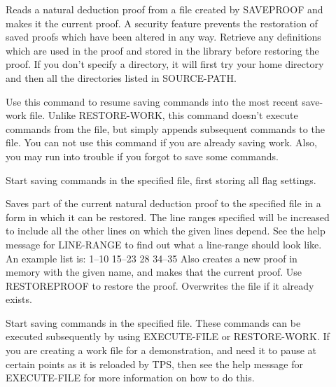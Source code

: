 \begin{description}
\item[\parbox{\textwidth}{RESTOREPROOF \textit{savefile}}]  
Reads a natural deduction proof from a file created by SAVEPROOF
and makes it the current proof.  A security feature prevents the 
restoration of saved proofs which have been altered in any way.
Retrieve any definitions which are used in the proof and stored in the
library before restoring the proof. If you don't specify a directory,
it will first try your home directory and then all the directories 
listed in SOURCE-PATH.

\item[\parbox{\textwidth}{RESUME-SAVE}]  
Use this command to resume saving commands into the most recent
save-work file.  Unlike RESTORE-WORK, this command doesn't
execute commands from the file, but simply appends subsequent commands to
the file.  You can not use this command if you are already saving work.
Also, you may run into trouble if you forgot to save some commands. 

\item[\parbox{\textwidth}{SAVE-FLAGS-AND-WORK \textit{savefile}}]  
Start saving commands in the specified file, first storing all
flag settings.

\item[\parbox{\textwidth}{SAVE-SUBPROOF \textit{savefile} \textit{lines} \textit{subname}}]  
Saves part of the current natural deduction proof to 
the specified file in a form in which it can be restored.  
The line ranges specified will be increased to include all the
other lines on which the given lines depend. See the help 
message for LINE-RANGE to find out what a line-range should 
look like. An example list is: 1--10 15--23 28 34--35
Also creates a new proof in memory with the given name, and
makes that the current proof.
Use RESTOREPROOF to restore the proof.
Overwrites the file if it already exists.

\item[\parbox{\textwidth}{SAVE-WORK \textit{savefile}}]  
Start saving commands in the specified file. These commands can be
executed subsequently by using EXECUTE-FILE or RESTORE-WORK. If you are 
creating a work file for a demonstration, and need it to pause at certain
points as it is reloaded by TPS, then see the help message for EXECUTE-FILE
for more information on how to do this.


\end{description}
